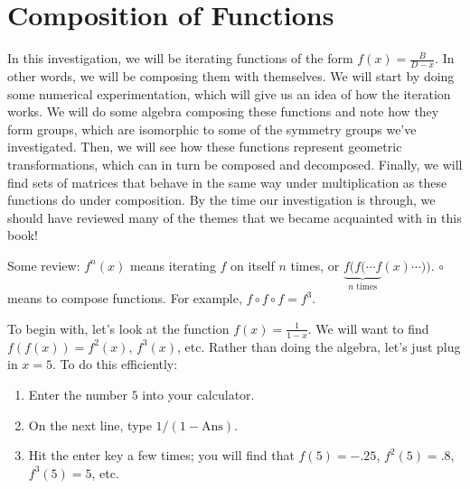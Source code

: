 \documentclass[../gatm.tex]{subfiles}
\begin{document}
\section{Composition of Functions}

In this investigation, we will be iterating functions of the form $f(x)=\frac{B}{D-x}$. In other words, we will be composing them with themselves. We will start by doing some numerical experimentation, which will give us an idea of how the iteration works. We will do some algebra composing these functions and note how they form groups, which are isomorphic to some of the symmetry groups we've investigated. Then, we will see how these functions represent geometric transformations, which can in turn be composed and decomposed. Finally, we will find sets of matrices that behave in the same way under multiplication as these functions do under composition. By the time our investigation is through, we should have reviewed many of the themes that we became acquainted with in this book!

Some review: $f^n(x)$ means iterating $f$ on itself $n$ times, or $\underbrace{f(f(\cdots f}_{n\text{ times}}(x)\cdots ))$. $\circ$ means to compose functions. For example, $f\circ f\circ f = f^3$.

To begin with, let's look at the function $f(x)=\frac{1}{1-x}$. We will want to find $f(f(x))=f^2(x)$, $f^3(x)$, etc. Rather than doing the algebra, let's just plug in $x=5$. To do this efficiently:

\begin{enumerate}
\item Enter the number $5$ into your calculator.
\item On the next line, type $1/(1-\text{Ans}).$
\item Hit the enter key a few times; you will find that $f(5)=-.25$, $f^2(5)=.8$, $f^3(5)=5$, etc.
\end{enumerate}
\end{document}
